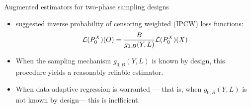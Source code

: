\documentclass{beamer}
\begin{document}

\begin{frame}[c]{Augmented estimators for two-phase sampling designs}

\begin{center}
\begin{itemize}
  \itemsep8pt
  \item \cite{rose2011targeted2sd} suggested inverse probability of censoring
    weighted (IPCW) loss functions:
    \begin{equation*}
      \mathcal{L}(P_0^X)(O) = \frac{B}{g_{0,B}(Y, L)}\mathcal{L}(P_0^X)(X)
    \end{equation*}
  \item When the sampling mechanism $g_{0,B}(Y,L)$ is known by design, this
    procedure yields a reasonably reliable estimator.
  \item When data-adaptive regression is warranted --- that is, when
    $g_{0,B}(Y,L)$ is not known by design\footnotemark --- this is inefficient.
\end{itemize}
\end{center}

\note{
}


\end{frame}

\end{document}
